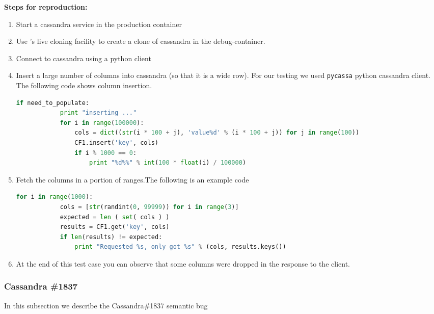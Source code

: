 \noindent \textbf{Steps for reproduction:} \\

\begin{adjustwidth}{0.5cm}{}
	\begin{enumerate}
		\item Start a cassandra service in the production container
		\item Use \parikshan's live cloning facility to create a clone of cassandra in the debug-container.
		\item Connect to cassandra using a python client
		\item Insert a large number of columns into cassandra (so that it is a wide row). For our testing we used \texttt{pycassa} python cassandra client. The following code shows column insertion.
		
		\begin{lstlisting}[language=python]
		if need_to_populate:
			print "inserting ..."
			for i in range(100000):
				cols = dict((str(i * 100 + j), 'value%d' % (i * 100 + j)) for j in range(100))
				CF1.insert('key', cols)
				if i % 1000 == 0:
					print "%d%%" % int(100 * float(i) / 100000)
		\end{lstlisting}
		
		\item Fetch the columns in a portion of ranges.The following is an example code
		
		\begin{lstlisting}[language=python]
		for i in range(1000):
			cols = [str(randint(0, 99999)) for i in range(3)]
			expected = len ( set( cols ) )
			results = CF1.get('key', cols)
			if len(results) != expected:
				print "Requested %s, only got %s" % (cols, results.keys())
		\end{lstlisting}
		
		\item At the end of this test case you can observe that some columns were dropped in the response to the client.
	\end{enumerate}

\end{adjustwidth}

\subsubsection{Cassandra \#1837}

In this subsection we describe the Cassandra\#1837 semantic bug \\

